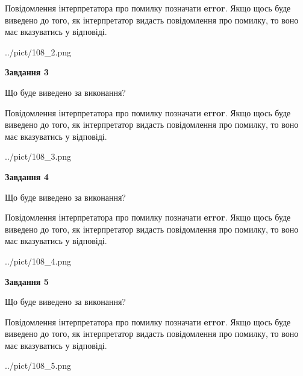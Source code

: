 \documentclass[12pt, ukrainian]{article}
\begin{document}
{\begin {large}
Повідомлення інтерпретатора про помилку позначати \textbf{error}.
Якщо щось буде виведено до того, як інтерпретатор видасть повідомлення про помилку, 
то воно має вказуватись у відповіді. \par


\begin{center}
	{../pict/108_2.png}
\end{center}
\newpage

{\begin {center}\textbf{Завдання 3}\end {center}}\par
Що буде виведено за виконання?

Повідомлення інтерпретатора про помилку позначати \textbf{error}.
Якщо щось буде виведено до того, як інтерпретатор видасть повідомлення про помилку, 
то воно має вказуватись у відповіді. \par


\begin{center}
	{../pict/108_3.png}
\end{center}
\newpage

{\begin {center}\textbf{Завдання 4}\end {center}}\par
Що буде виведено за виконання?

Повідомлення інтерпретатора про помилку позначати \textbf{error}.
Якщо щось буде виведено до того, як інтерпретатор видасть повідомлення про помилку, 
то воно має вказуватись у відповіді. \par


\begin{center}
	{../pict/108_4.png}
\end{center}
\newpage

{\begin {center}\textbf{Завдання 5}\end {center}}\par
Що буде виведено за виконання?

Повідомлення інтерпретатора про помилку позначати \textbf{error}.
Якщо щось буде виведено до того, як інтерпретатор видасть повідомлення про помилку, 
то воно має вказуватись у відповіді. \par


\begin{center}
	{../pict/108_5.png}
\end{center}
\newpage


\end{large}}
\end{document}
